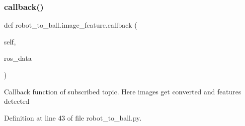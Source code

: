 \subsubsection{\texorpdfstring{callback()}{callback()}}
{\footnotesize\ttfamily def robot\+\_\+to\+\_\+ball.\+image\+\_\+feature.\+callback (\begin{DoxyParamCaption}\item[{}]{self,  }\item[{}]{ros\+\_\+data }\end{DoxyParamCaption})}

\begin{DoxyVerb}Callback function of subscribed topic. 
Here images get converted and features detected\end{DoxyVerb}
 

Definition at line 43 of file robot\+\_\+to\+\_\+ball.\+py.



